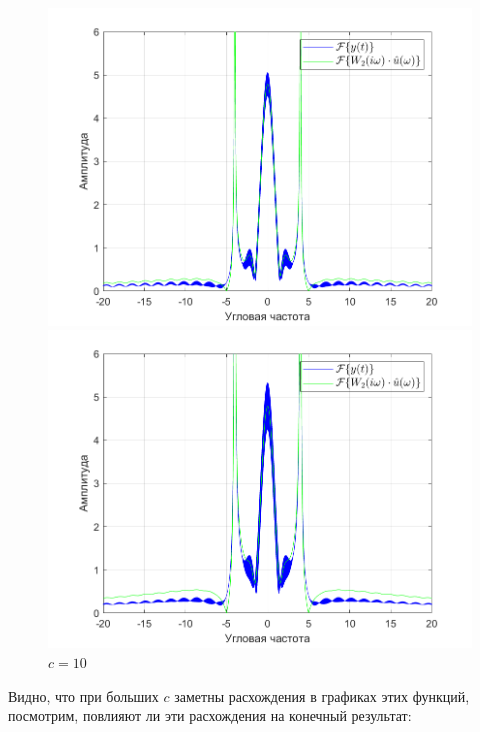 \documentclass[a4paper]{article}
\begin{document}
\begin{figure}[H]
    \begin{minipage}{0.5\textwidth}
        \centering
        \includegraphics[width=\linewidth]{ex1_2/приближение/a1=0_a2=25_b1=10.5_b2=25_d=4_c=5/h5.png}
        \caption{$c=5$}
    \end{minipage}
    \begin{minipage}{0.5\textwidth}
        \centering
        \includegraphics[width=\linewidth]{ex1_2/приближение/a1=0_a2=25_b1=10.5_b2=25_d=4_c=10/h5.png}
        \caption{$c=10$}
    \end{minipage}
\end{figure}

Видно, что при больших $c$ заметны расхождения в графиках этих функций, посмотрим, повлияют ли эти расхождения на конечный результат:
\end{document}
